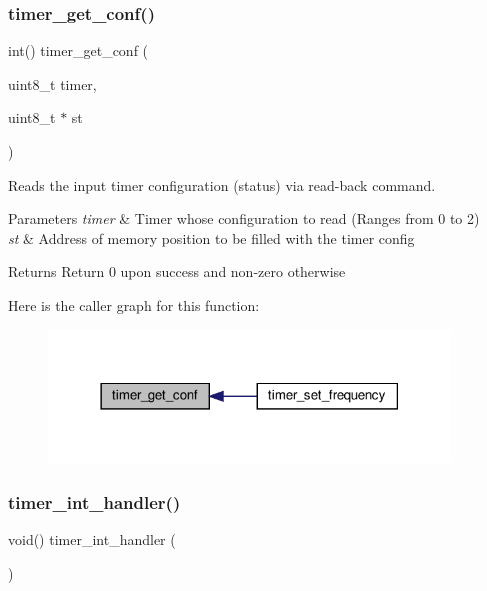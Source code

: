 \subsubsection{\texorpdfstring{timer\+\_\+get\+\_\+conf()}{timer\_get\_conf()}}
{\footnotesize\ttfamily int() timer\+\_\+get\+\_\+conf (\begin{DoxyParamCaption}\item[{uint8\+\_\+t}]{timer,  }\item[{uint8\+\_\+t $\ast$}]{st }\end{DoxyParamCaption})}



Reads the input timer configuration (status) via read-\/back command. 


\begin{DoxyParams}{Parameters}
{\em timer} & Timer whose configuration to read (Ranges from 0 to 2) \\
\hline
{\em st} & Address of memory position to be filled with the timer config \\
\hline
\end{DoxyParams}
\begin{DoxyReturn}{Returns}
Return 0 upon success and non-\/zero otherwise 
\end{DoxyReturn}
Here is the caller graph for this function\+:\nopagebreak
\begin{figure}[H]
\begin{center}
\leavevmode
\includegraphics[width=302pt]{group__timer_ga703c60b40c8c49607d6ecb6fef82d27a_icgraph}
\end{center}
\end{figure}
\mbox{\label{group__timer_ga91a2072306c68353712a6b771287dc2c}} 
\subsubsection{\texorpdfstring{timer\+\_\+int\+\_\+handler()}{timer\_int\_handler()}}
{\footnotesize\ttfamily void() timer\+\_\+int\+\_\+handler (\begin{DoxyParamCaption}{ }\end{DoxyParamCaption})}




